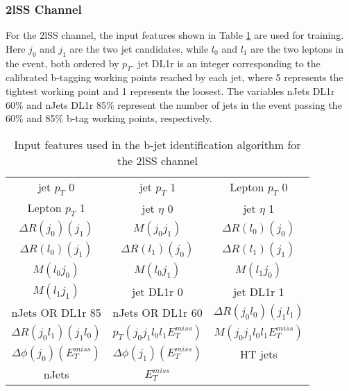 \subsubsection{2lSS Channel}
\label{subsec:top2lSS}

For the 2lSS channel, the input features shown in Table \ref{tab:top2lSSfeatures} are used for training. Here $j_0$ and $j_1$ are the two jet candidates, while $l_0$ and $l_1$ are the two leptons in the event, both ordered by $p_T$. jet DL1r is an integer corresponding to the calibrated b-tagging working points reached by each jet, where 5 represents the tightest working point and 1 represents the loosest. The variables nJets DL1r 60\% and nJets DL1r 85\% represent the number of jets in the event passing the 60\% and 85\% b-tag working points, respectively.

\begin{table}[H]
  \begin{center}
  \begin{tabular}{ccc}
  \hline\hline
    jet  $p_T$ 0 & jet  $p_T$ 1 & Lepton  $p_T$ 0 \\
    Lepton  $p_T$ 1 & jet  $\eta$ 0 & jet  $\eta$ 1 \\
    $\Delta R(j_0)(j_1)$ & $M(j_0j_1)$ & $\Delta R(l_0)(j_0)$ \\
    $\Delta R(l_0)(j_1)$ & $\Delta R(l_1)(j_0)$ & $\Delta R(l_1)(j_1)$ \\
    $M(l_0j_0)$ & $M(l_0j_1)$ & $M(l_1j_0)$ \\
    $M(l_1j_1)$ & jet DL1r 0 & jet DL1r 1 \\
    nJets OR DL1r 85 & nJets OR DL1r 60 & $\Delta R(j_0l_0)(j_1l_1)$ \\
    $\Delta R(j_0l_1)(j_1l_0)$ &  $p_T(j_0j_1l_0l_1E_T^{miss})$ & $M(j_0j_1l_0l_1E_T^{miss})$ \\
    $\Delta\phi(j_0)(E_T^{miss})$ & $\Delta\phi(j_1)(E_T^{miss})$ & HT jets \\
    nJets & $E_T^{miss}$ & \\
  \hline
  \end{tabular}
  \end{center}
  \caption{Input features used in the b-jet identification algorithm for the 2lSS channel}
  \label{tab:top2lSSfeatures}                                                                                               
\end{table}

